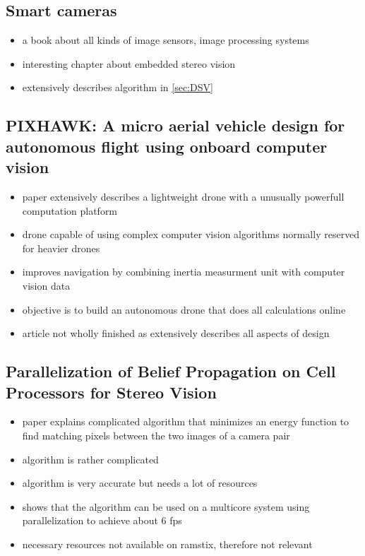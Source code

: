 \subsection{Smart cameras}
\begin{itemize}
\item a book about all kinds of image sensors, image processing systems
\item interesting chapter about embedded stereo vision
\item extensively describes algorithm in \ref{sec:DSV}
\end{itemize}

\subsection{PIXHAWK: A micro aerial vehicle design for autonomous flight using onboard computer vision}
\begin{itemize}
	\item paper extensively describes a lightweight drone with a unusually powerfull computation platform
	\item drone capable of using complex computer vision algorithms normally reserved for heavier drones
	\item improves navigation by combining inertia measurment unit with computer vision data
	\item objective is to build an autonomous drone that does all calculations online
	\item article not wholly finished as extensively describes all aspects of design
\end{itemize}

\subsection{Parallelization of Belief Propagation on Cell Processors for Stereo Vision}
\begin{itemize}
	\item paper explains complicated algorithm that minimizes an energy function to find matching pixels between the two images of a camera pair
	\item algorithm is rather complicated
	\item algorithm is very accurate but needs a lot of resources
	\item shows that the algorithm can be used on a multicore system using parallelization to achieve about 6 fps
	\item necessary resources not available on ramstix, therefore not relevant
\end{itemize}

